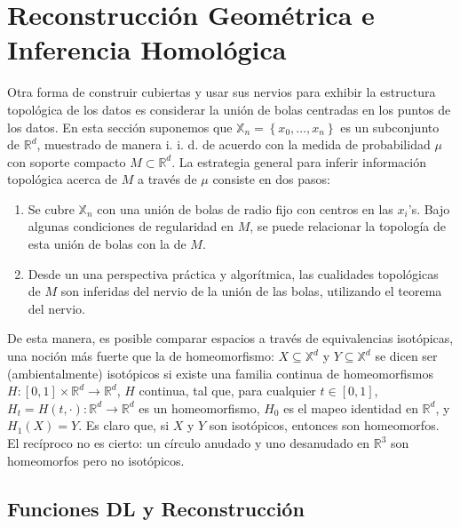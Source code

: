 \chapter{Reconstrucci\'on Geom\'etrica e Inferencia Homol\'ogica}

Otra forma de construir cubiertas y usar sus nervios para exhibir la estructura topol\'ogica de los datos
es considerar la uni\'on de bolas centradas en los puntos de los datos. En esta secci\'on suponemos que
$\mathbb{X}_n = \left\{x_0, \dots, x_n\right\}$ es un subconjunto de $\mathbb{R}^{d}$, muestrado de manera
i. i. d. de acuerdo con la medida de probabilidad $\mu$ con soporte compacto $M\subset\mathbb{R}^{d}$. La
estrategia general para inferir informaci\'on topol\'ogica acerca de $M$ a trav\'es de $\mu$ consiste en
dos pasos:

\begin{enumerate}
    \item Se cubre $\mathbb{X}_{n}$ con una uni\'on de bolas de radio fijo con centros en las $x_{i}$'s.
    Bajo algunas condiciones de regularidad en $M$, se puede relacionar la topolog\'ia de esta uni\'on de
    bolas con la de $M$.
    
    \item Desde un una perspectiva pr\'actica y algor\'itmica, las cualidades topol\'ogicas de $M$ son
    inferidas del nervio de la uni\'on de las bolas, utilizando el teorema del nervio.
    
\end{enumerate}

De esta manera, es posible comparar espacios a trav\'es de equivalencias isot\'opicas, una noci\'on m\'as
fuerte que la de homeomorfismo: $X\subseteq\mathbb{X}^{d}$ y $Y\subseteq\mathbb{X}^{d}$ se dicen ser
(ambientalmente) isot\'opicos si existe una familia continua de homeomorfismos
$H: \left[0, 1\right]\times\mathbb{R}^{d}\rightarrow\mathbb{R}^{d}$, $H$ continua, tal que, para cualquier
$t\in\left[0, 1\right]$, $H_{t} = H\left(t, \cdot\right):\mathbb{R}^{d}\rightarrow\mathbb{R}^{d}$ es un
homeomorfismo, $H_{0}$ es el mapeo identidad en $\mathbb{R}^{d}$, y $H_{1}\left(X\right)=Y$.
Es claro que, si $X$ y $Y$ son isot\'opicos, entonces son homeomorfos. El rec\'iproco no es cierto:
un c\'irculo anudado y uno desanudado en $\mathbb{R}^{3}$ son homeomorfos pero no isot\'opicos.

\section*{Funciones DL y Reconstrucci\'on}

